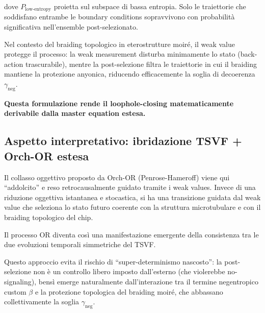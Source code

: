 \documentclass[11pt,a4paper]{article}
\theoremstyle{plain}
\theoremstyle{definition}
\begin{document}
\vspace{0.3cm}



dove \( P_{\text{low-entropy}} \) proietta sul subspace di bassa entropia. Solo le traiettorie che soddisfano entrambe le boundary conditions sopravvivono con probabilità significativa nell'ensemble post-selezionato.


\vspace{0.4cm}

Nel contesto del braiding topologico in eterostrutture moiré, il weak value protegge il processo: la weak measurement disturba minimamente lo stato (back-action trascurabile), mentre la post-selezione filtra le traiettorie in cui il braiding mantiene la protezione anyonica, riducendo efficacemente la soglia di decoerenza \( \gamma_{\text{neg}} \). 


\vspace{0.2cm}


\textbf{Questa formulazione rende il loophole-closing matematicamente derivabile dalla master equation estesa.}



\vspace{0.5cm}

\subsection{Aspetto interpretativo: ibridazione TSVF + Orch-OR estesa}

\vspace{0.2cm}

Il collasso oggettivo proposto da Orch-OR (Penrose-Hameroff) viene qui ``addolcito'' e reso retrocausalmente guidato tramite i weak values. Invece di una riduzione oggettiva istantanea e stocastica, si ha una transizione guidata dal weak value che seleziona lo stato futuro coerente con la struttura microtubulare e con il braiding topologico del chip. 


\vspace{0.3cm}


Il processo OR diventa così una manifestazione emergente della consistenza tra le due evoluzioni temporali simmetriche del TSVF.

\vspace{0.2cm}

Questo approccio evita il rischio di ``super-determinismo nascosto'': la post-selezione non è un controllo libero imposto dall'esterno (che violerebbe no-signaling), bensì emerge naturalmente dall'interazione tra il termine negentropico custom \( \beta \) e la protezione topologica del braiding moiré, che abbassano collettivamente la soglia \( \gamma_{\text{neg}} \). 
\end{document}
